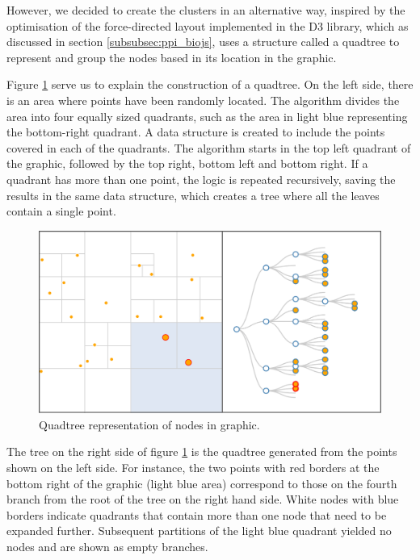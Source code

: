 However, we decided to create the clusters in an alternative way, inspired by the optimisation of the force-directed layout implemented in the D3 library, which as discussed in section \ref{subsubsec:ppi_biojs}, uses a structure called a quadtree to represent and group the nodes based in its location in the graphic.
 
Figure \ref{fig:quadtree} serve us to explain the construction of a quadtree. On the left side, there is an area where points have been randomly located. The algorithm divides the area into four equally sized quadrants, such as the area in light blue representing the bottom-right quadrant. A data structure is created to include the points covered in each of the quadrants. The algorithm starts in the top left quadrant of the graphic, followed by the top right, bottom left and bottom right. If a quadrant has more than one point, the logic is repeated recursively, saving the results in the same data structure, which creates a tree where all the leaves contain a single point. 

\begin{figure}[ht]
\centering
\includegraphics[width=\textwidth]{figures/quadtree.png}
\caption[Quadtree representation of nodes in graphic.]{Quadtree representation of nodes in graphic. 
\label{fig:quadtree}}
\end{figure}


The tree on the right side of figure \ref{fig:quadtree} is the quadtree generated from the points shown on the left side. For instance, the two points with red borders at the bottom right of the graphic (light blue area) correspond to those on the fourth branch from the root of the tree on the right hand side. White nodes with blue borders indicate quadrants that contain more than one node that need to be expanded further. Subsequent partitions  of the light blue quadrant yielded no nodes and are shown as empty branches.

